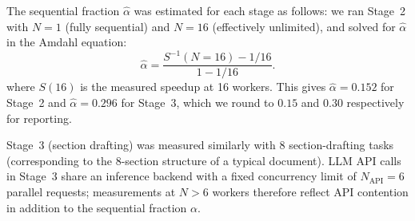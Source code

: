 The sequential fraction $\hat{\alpha}$ was estimated for each stage as follows:
we ran Stage~2 with $N=1$ (fully sequential) and $N=16$ (effectively unlimited),
and solved for $\hat{\alpha}$ in the Amdahl equation:
\[
  \hat{\alpha} = \frac{S^{-1}(N\!=\!16) - 1/16}{1 - 1/16}.
\]
where $S(16)$ is the measured speedup at 16 workers.
This gives $\hat{\alpha}=0.152$ for Stage~2 and $\hat{\alpha}=0.296$ for Stage~3,
which we round to $0.15$ and $0.30$ respectively for reporting.

Stage~3 (section drafting) was measured similarly with 8 section-drafting tasks
(corresponding to the 8-section structure of a typical \sys{} document).
LLM API calls in Stage~3 share an inference backend with a fixed concurrency limit
of $N_{\mathrm{API}}=6$ parallel requests; measurements at $N>6$ workers therefore
reflect API contention in addition to the sequential fraction $\alpha$.
